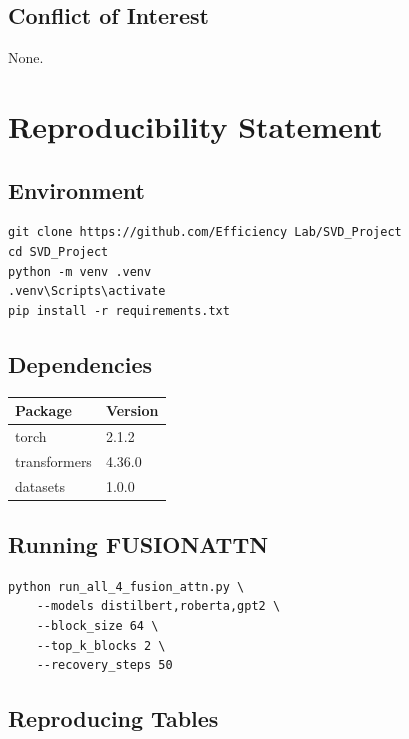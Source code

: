 \subsection{Conflict of Interest}

None.



\section{Reproducibility Statement}

\subsection{Environment}

\begin{lstlisting}
git clone https://github.com/Efficiency Lab/SVD_Project
cd SVD_Project
python -m venv .venv
.venv\Scripts\activate
pip install -r requirements.txt
\end{lstlisting}

\subsection{Dependencies}

\begin{table}[H]
\centering
\small
\begin{tabular}{ll}
\toprule
\textbf{Package} & \textbf{Version} \\
\midrule
torch & 2.1.2 \\
transformers & 4.36.0 \\
datasets & 1.0.0 \\
\bottomrule
\end{tabular}
\end{table}

\subsection{Running FUSIONATTN}

\begin{lstlisting}
python run_all_4_fusion_attn.py \
    --models distilbert,roberta,gpt2 \
    --block_size 64 \
    --top_k_blocks 2 \
    --recovery_steps 50
\end{lstlisting}

\subsection{Reproducing Tables}

